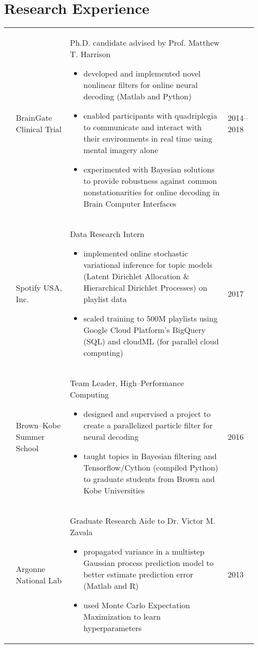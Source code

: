 \section*{Research Experience}
\begin{longtabu} to \textwidth {X[0.3,c]  X[1.3,l]  X[3,l]  X[.8,r]} 
& BrainGate \newline Clinical Trial
& Ph.D. candidate \newline advised by Prof. Matthew T. Harrison
\begin{itemize}
    \item developed and implemented novel nonlinear filters for online neural decoding (Matlab and Python)
    \item enabled participants with quadriplegia to communicate and interact with their environments in real time using mental imagery alone
    \item experimented with Bayesian solutions to provide robustness against common nonstationarities for online decoding in Brain Computer Interfaces
\end{itemize}
& 2014--2018 \\
& Spotify USA, Inc.
& Data Research Intern
\begin{itemize} 
    \item implemented online stochastic variational inference for topic models (Latent Dirichlet Allocation \& Hierarchical Dirichlet Processes) on playlist data
    \item scaled training to 500M playlists using Google Cloud Platform’s BigQuery (SQL) and cloudML (for parallel cloud computing)
\end{itemize}
& 2017
\\[0.5cm]
& Brown--Kobe \newline Summer School
& Team Leader, High--Performance Computing
\begin{itemize} 
    \item designed and supervised a project to create a parallelized particle filter for neural decoding
    \item taught topics in Bayesian filtering and Tensorflow/Cython (compiled Python) to graduate students from Brown and Kobe Universities
\end{itemize}
& 2016
\\[0.5cm]
& Argonne \newline National Lab
& Graduate Research Aide to Dr. Victor M. Zavala
\begin{itemize}
    \item propagated variance in a multistep Gaussian process prediction model to better estimate prediction error (Matlab and R)
    \item used Monte Carlo Expectation Maximization to learn hyperparameters
\end{itemize}
& 2013
\end{longtabu}

